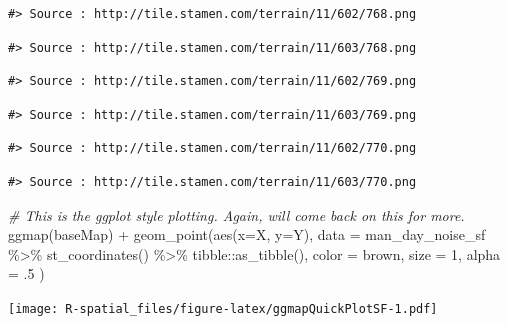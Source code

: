 \documentclass[
  11pt,
]{book}
\newenvironment{Shaded}{\begin{snugshade}}{\end{snugshade}}
\newcommand{\AttributeTok}[1]{\textcolor[rgb]{0.77,0.63,0.00}{#1}}
\newcommand{\CommentTok}[1]{\textcolor[rgb]{0.56,0.35,0.01}{\textit{#1}}}
\newcommand{\DecValTok}[1]{\textcolor[rgb]{0.00,0.00,0.81}{#1}}
\newcommand{\FunctionTok}[1]{\textcolor[rgb]{0.00,0.00,0.00}{#1}}
\newcommand{\NormalTok}[1]{#1}
\newcommand{\SpecialCharTok}[1]{\textcolor[rgb]{0.00,0.00,0.00}{#1}}
\newcommand{\StringTok}[1]{\textcolor[rgb]{0.31,0.60,0.02}{#1}}
\begin{document}
\begin{verbatim}
#> Source : http://tile.stamen.com/terrain/11/602/768.png
\end{verbatim}

\begin{verbatim}
#> Source : http://tile.stamen.com/terrain/11/603/768.png
\end{verbatim}

\begin{verbatim}
#> Source : http://tile.stamen.com/terrain/11/602/769.png
\end{verbatim}

\begin{verbatim}
#> Source : http://tile.stamen.com/terrain/11/603/769.png
\end{verbatim}

\begin{verbatim}
#> Source : http://tile.stamen.com/terrain/11/602/770.png
\end{verbatim}

\begin{verbatim}
#> Source : http://tile.stamen.com/terrain/11/603/770.png
\end{verbatim}

\begin{Shaded}
\begin{Highlighting}[]
\CommentTok{\# This is the ggplot style plotting. Again, will come back on this for more.}
\FunctionTok{ggmap}\NormalTok{(baseMap) }\SpecialCharTok{+}
  \FunctionTok{geom\_point}\NormalTok{(}\FunctionTok{aes}\NormalTok{(}\AttributeTok{x=}\NormalTok{X, }\AttributeTok{y=}\NormalTok{Y), }
             \AttributeTok{data =}\NormalTok{ man\_day\_noise\_sf }\SpecialCharTok{\%\textgreater{}\%} \FunctionTok{st\_coordinates}\NormalTok{() }\SpecialCharTok{\%\textgreater{}\%}\NormalTok{ tibble}\SpecialCharTok{::}\FunctionTok{as\_tibble}\NormalTok{(),}
             \AttributeTok{color =} \StringTok{\textquotesingle{}brown\textquotesingle{}}\NormalTok{,}
             \AttributeTok{size =} \DecValTok{1}\NormalTok{,}
             \AttributeTok{alpha =}\NormalTok{ .}\DecValTok{5}
\NormalTok{             )}
\end{Highlighting}
\end{Shaded}

\texttt{[image: R-spatial\_files/figure-latex/ggmapQuickPlotSF-1.pdf]}
\end{document}
